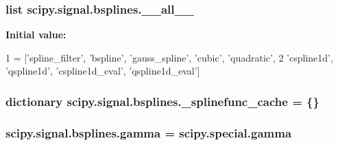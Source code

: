 \subsubsection[{\+\_\+\+\_\+all\+\_\+\+\_\+}]{\setlength{\rightskip}{0pt plus 5cm}list scipy.\+signal.\+bsplines.\+\_\+\+\_\+all\+\_\+\+\_\+}\label{namespacescipy_1_1signal_1_1bsplines_a245948568a8b033d93b5557b742932c9}
{\bfseries Initial value\+:}
\begin{DoxyCode}
1 = [\textcolor{stringliteral}{'spline\_filter'}, \textcolor{stringliteral}{'bspline'}, \textcolor{stringliteral}{'gauss\_spline'}, \textcolor{stringliteral}{'cubic'}, \textcolor{stringliteral}{'quadratic'},
2            \textcolor{stringliteral}{'cspline1d'}, \textcolor{stringliteral}{'qspline1d'}, \textcolor{stringliteral}{'cspline1d\_eval'}, \textcolor{stringliteral}{'qspline1d\_eval'}]
\end{DoxyCode}
\hypertarget{namespacescipy_1_1signal_1_1bsplines_aeabca2856d3743b7d306ed99fc524b7d}{}
\subsubsection[{\+\_\+splinefunc\+\_\+cache}]{\setlength{\rightskip}{0pt plus 5cm}dictionary scipy.\+signal.\+bsplines.\+\_\+splinefunc\+\_\+cache = \{\}}\label{namespacescipy_1_1signal_1_1bsplines_aeabca2856d3743b7d306ed99fc524b7d}
\hypertarget{namespacescipy_1_1signal_1_1bsplines_a7f2e8ea608e042f8f0037f248fcd7eac}{}
\subsubsection[{gamma}]{\setlength{\rightskip}{0pt plus 5cm}scipy.\+signal.\+bsplines.\+gamma = scipy.\+special.\+gamma}\label{namespacescipy_1_1signal_1_1bsplines_a7f2e8ea608e042f8f0037f248fcd7eac}
